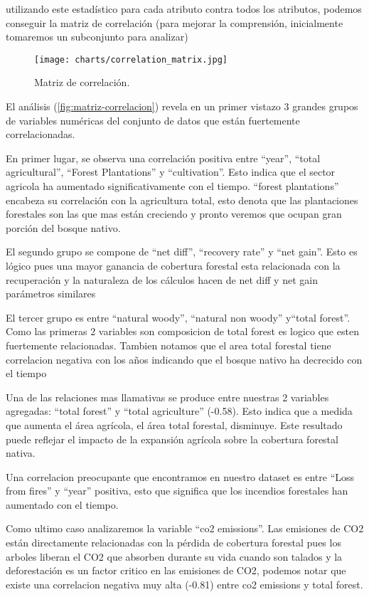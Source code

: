 \documentclass[11pt]{article}
\begin{document}
utilizando este estadístico para cada atributo contra todos los atributos, podemos conseguir la matriz de correlación (para mejorar la comprensión, inicialmente tomaremos un subconjunto para analizar)
\begin{figure}[H]
    \centering
    \texttt{[image: charts/correlation\_matrix.jpg]}
    \caption{Matriz de correlación.}
    \label{fig:matriz-correlacion}
\end{figure}

El análisis (\autoref{fig:matriz-correlacion}) revela en un primer vistazo 3 grandes grupos de variables numéricas del conjunto de datos que están fuertemente correlacionadas.

En primer lugar, se observa una correlación positiva entre ``year'', ``total agricultural'', ``Forest Plantations'' y ``cultivation''. Esto indica que el sector agricola ha aumentado significativamente con el tiempo. ``forest plantations'' encabeza su correlación con la agricultura total, esto denota que las plantaciones forestales son las que mas están creciendo y pronto veremos que ocupan gran porción del bosque nativo.

El segundo grupo se compone de ``net diff'', ``recovery rate'' y ``net gain''. Esto es lógico pues una mayor ganancia de cobertura forestal esta relacionada con la recuperación y la naturaleza de los cálculos hacen de net diff y net gain parámetros similares

El tercer grupo es entre ``natural woody'', ``natural non woody'' y``total forest''. Como las primeras 2 variables son composicion de total forest es logico que esten fuertemente relacionadas.
Tambien notamos que el area total forestal tiene correlacion negativa con los años indicando que el bosque nativo ha decrecido con el tiempo

Una de las relaciones mas llamativas se produce entre nuestras 2 variables agregadas: ``total forest'' y ``total agriculture'' (-0.58). Esto indica que a medida que aumenta el área agrícola, el área total forestal, disminuye. Este resultado puede reflejar el impacto de la expansión agrícola sobre la cobertura forestal nativa.

Una correlacion preocupante que encontramos en nuestro dataset es entre ``Loss from fires'' y ``year'' positiva, esto que significa que los incendios forestales han aumentado con el tiempo.

Como ultimo caso analizaremos la variable ``co2 emissions''. Las emisiones de CO2 están directamente relacionadas con la pérdida de cobertura forestal pues los arboles liberan el CO2 que absorben durante su vida cuando son talados y la deforestación es un factor critico en las emisiones de CO2, podemos notar que existe una correlacion negativa muy alta (-0.81) entre co2 emissions y total forest.
\end{document}
